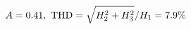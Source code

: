 \documentclass[preview]{standalone}
\begin{document}
\begin{align*}
\special{dvisvgm:raw <g id='unique000'>}A=0.41,\ \text{THD}=\sqrt{H_2^2+H_3^2}/H_1=7.9\%\special{dvisvgm:raw </g>}
\end{align*}
\end{document}
